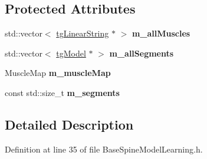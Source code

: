 \subsection*{Protected Attributes}
\begin{DoxyCompactItemize}
\item 
\hypertarget{class_base_spine_model_learning_a9cd74c4c79da8749fb5c8bffecede666}{std\-::vector$<$ \hyperlink{classtg_linear_string}{tg\-Linear\-String} $\ast$ $>$ {\bfseries m\-\_\-all\-Muscles}}\label{class_base_spine_model_learning_a9cd74c4c79da8749fb5c8bffecede666}

\item 
\hypertarget{class_base_spine_model_learning_a1c1e64b40b4c67189fbc67ad411f316a}{std\-::vector$<$ \hyperlink{classtg_model}{tg\-Model} $\ast$ $>$ {\bfseries m\-\_\-all\-Segments}}\label{class_base_spine_model_learning_a1c1e64b40b4c67189fbc67ad411f316a}

\item 
\hypertarget{class_base_spine_model_learning_a75cad2ae3b68f93d283550b417af5523}{Muscle\-Map {\bfseries m\-\_\-muscle\-Map}}\label{class_base_spine_model_learning_a75cad2ae3b68f93d283550b417af5523}

\item 
\hypertarget{class_base_spine_model_learning_a5d68dbbcbda4091b040279200a185d50}{const std\-::size\-\_\-t {\bfseries m\-\_\-segments}}\label{class_base_spine_model_learning_a5d68dbbcbda4091b040279200a185d50}

\end{DoxyCompactItemize}


\subsection{Detailed Description}


Definition at line 35 of file Base\-Spine\-Model\-Learning.\-h.



